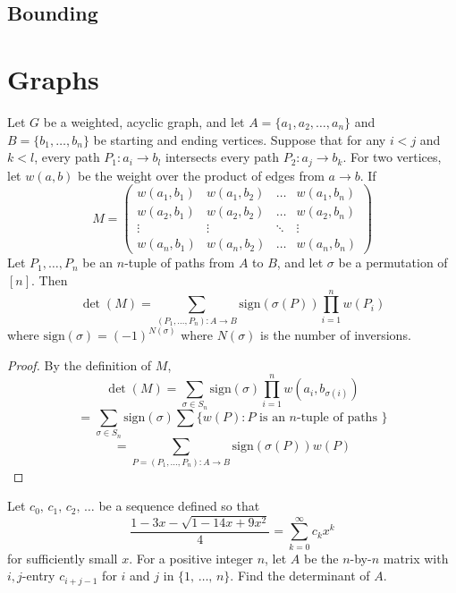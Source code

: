 \documentclass[11pt]{scrartcl}
\theoremstyle{plain} %
\theoremstyle{definition}
\theoremstyle{remark}
\theoremstyle{empty}
\theoremstyle{empty}
\theoremstyle{empty}
\theoremstyle{empty}
\theoremstyle{empty}
\theoremstyle{empty}
\theoremstyle{empty}
\theoremstyle{empty}
\begin{document}
\subsection{Bounding}

\section{Graphs}

\begin{lemma}
  Let $G$ be a weighted, acyclic graph, and let $A = \{a_1, a_2, \ldots, a_n\}$ and $B = \{b_1, \ldots, b_n\}$ be starting and ending vertices. Suppose that for any $i< j$ and $k<l$, every path $P_1 : a_i \to b_l$ intersects every path $P_2 : a_j \to b_k$. For two vertices, let $w(a,b)$ be the weight over the product of edges from $a \to b$. If \[M = \begin{pmatrix}
    w(a_1, b_1) & w(a_1, b_2) & \ldots & w(a_1, b_n) \\ w(a_2, b_1) & w(a_2, b_2) & \ldots & w(a_2, b_n) \\ \vdots & \vdots & \ddots & \vdots \\ w(a_n, b_1) & w(a_n, b_2) & \ldots & w(a_n, b_n)
  \end{pmatrix}\] Let $P_1, \ldots, P_n$ be an $n$-tuple of paths from $A$ to $B$, and let $\sigma$ be a permutation of $[n]$. Then \[\det(M) = \sum_{(P_1, \ldots, P_n) : A \to B} \text{sign}(\sigma(P)) \prod_{i=1}^n w(P_i)\] where $\text{sign}(\sigma) = (-1)^{N(\sigma)}$ where $N(\sigma)$ is the number of inversions. 
\end{lemma}

\begin{proof}
  By the definition of $M$, \[\det(M) = \sum_{\sigma \in S_n} \text{sign}(\sigma) \prod_{i=1}^n w(a_i, b_{\sigma(i)}) \] \[ =  \sum_{\sigma \in S_n} \text{sign}(\sigma) \sum \{w(P) : P \text{ is an $n$-tuple of paths }\}\] \[ =  \sum_{P = (P_1, \ldots, P_n) : A \to B} \text{sign}(\sigma(P)) w(P) \]
\end{proof}

\begin{problem}[2024 Putnam A6]
  Let $c_0,\,c_1,\,c_2,\,\ldots$ be a sequence defined so that
\[
\frac{1-3x-\sqrt{1-14x+9x^2}}{4}=\sum_{k=0}^\infty c_kx^k
\]for sufficiently small $x$. For a positive integer $n$, let $A$ be the $n$-by-$n$ matrix with $i,j$-entry $c_{i+j-1}$ for $i$ and $j$ in $\{1,\,\ldots,\,n\}$. Find the determinant of $A$.
\end{problem}
\end{document}
